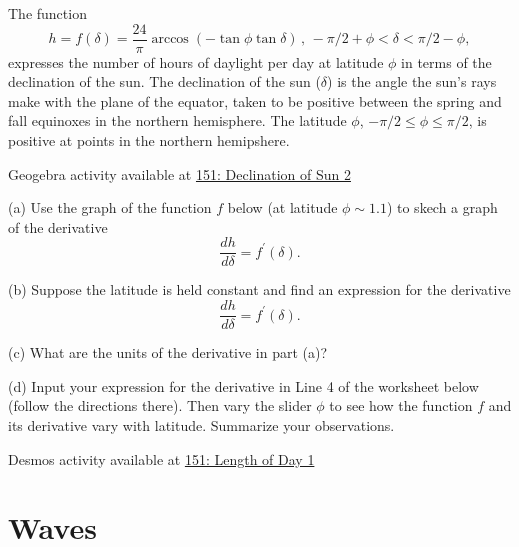 \documentclass{ximera}
\begin{document}
\begin{question}  \label{Q:er43455}
The function
\[
    h = f(\delta) = \frac{24}{\pi} \arccos(-\tan\phi \tan\delta) \, , \, -\pi/2+\phi < \delta < \pi/2-\phi ,
\]
expresses the number of hours of daylight per day at latitude $\phi$ in terms of the declination of the sun. The declination of the sun ($\delta$) is the angle the sun's rays make with the plane of the equator, taken to be positive between the spring and fall equinoxes in the northern hemisphere. The latitude $\phi$, $-\pi/2 \leq \phi \leq \pi/2$, is positive at points in the northern hemipshere.

\begin{onlineOnly}
    \begin{center}
\end{center}
\end{onlineOnly}

Geogebra activity available at \href{https://www.geogebra.org/classic/vnhrutwu}{151: Declination of Sun 2}


(a) Use the graph of the function $f$ below (at latitude $\phi \sim 1.1$) to skech a graph of the derivative
\[
   \frac{dh}{d\delta} = f^\prime(\delta) .
\]

(b) Suppose the latitude is held constant and find an expression for the derivative 
\[
   \frac{dh}{d\delta} = f^\prime(\delta) .
\]

(c) What are the units of the derivative in part (a)?

(d) Input your expression for the derivative in Line 4 of the worksheet below (follow the directions there). Then vary the slider $\phi$ to see how the function $f$ and its derivative vary with latitude. Summarize your observations.


\begin{onlineOnly}
    \begin{center}
\end{center}
\end{onlineOnly}

Desmos activity available at \href{https://www.desmos.com/calculator/ifomatkcta}{151: Length of Day 1}

\end{question}


\section*{Waves}
\end{document}
